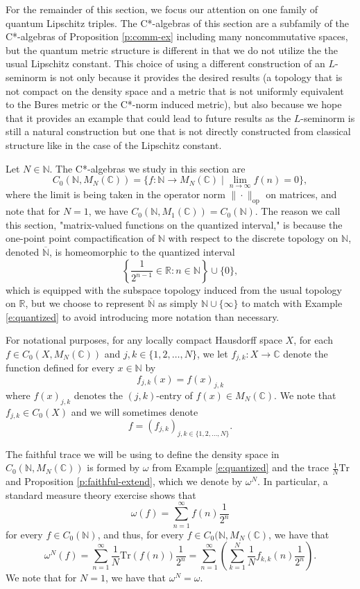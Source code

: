 \documentclass{amsart}
\theoremstyle{plain}
\theoremstyle{definition}
\theoremstyle{remark}
\numberwithin{equation}{section}
\newcommand{\om}{{\omega}}
\newcommand{\N}{{\mathds{N}}}
\newcommand{\R}{{\mathds{R}}}
\newcommand{\C}{{\mathds{C}}}
\begin{document}
For the remainder of this section, we focus our attention on one family of quantum Lipschitz triples. The C*-algebras of this section are a subfamily of the C*-algebras of Proposition \ref{p:comm-ex} including many noncommutative spaces, but the quantum metric structure is different in that we do not utilize the  the usual Lipschitz constant. This choice of using a different construction of an $L$-seminorm is not only because it provides the desired results (a topology that is not compact on the density space and a metric that is not uniformly equivalent to the Bures metric or the C*-norm induced metric), but also because we hope that it provides an example that could lead to future results   as the $L$-seminorm is still a natural construction but one that is not directly constructed from classical structure like in the case of the Lipschitz constant.



Let $N\in \N$. The C*-algebras we study in this section are
\[
C_0(\N, M_N(\C))=\{f:\N \rightarrow M_N(\C) \mid \lim_{n\to \infty}f(n)=0\},
\]
where the limit is being taken in the operator norm  $\|\cdot\|_\mathrm{op}$ on matrices, 
and note that for $N=1$, we have $C_0(\N, M_1(\C))=C_0(\N)$. 
The reason we call this section, "matrix-valued functions on the quantized interval," is because the one-point point compactification of $\N$ with respect to the discrete topology on $\N$, denoted $\overline{\N}$, is homeomorphic to the quantized interval
\[
\left\{ \frac{1}{2^{n-1}}\in \R : n\in \N\right\}\cup \{0\},
\]
which is equipped with the subspace topology induced from the usual topology on $\R$,  
but we choose to represent $\overline{\N}$ as simply $\N\cup \{\infty\}$ to match with Example \ref{e:quantized} to avoid introducing more notation than necessary.  

For notational purposes, for any locally compact Hausdorff space $X$, for each $f\in C_0(X, M_N(\C))$ and $j,k\in \{1, 2, \ldots, N\}$, we let $f_{j,k}: X\rightarrow \C$ denote the function defined for every $x\in \N$ by 
\[
f_{j,k}(x)=f(x)_{j,k}
\]
where $f(x)_{j,k}$ denotes the $(j,k)$-entry of $f(x)\in M_N(\C)$. We note that $f_{j,k}\in C_0(X)$ and we will sometimes denote
\[
f=(f_{j,k})_{j,k\in \{1,2,\ldots, N\}}.
\]

The faithful trace we will be using to define the density space in $C_0(\N, M_N(\C))$ is  formed by $\omega$ from Example \ref{e:quantized} and the trace $\frac{1}{N}\mathrm{Tr}$ and Proposition \ref{p:faithful-extend}, which we denote by $\om^N$. In particular,  a standard measure theory exercise shows that 
\[
\omega(f)=\sum_{n=1}^\infty f(n)\frac{1}{2^n}
\]
for every $f\in C_0(\N)$, and thus, for every $f\in C_0(\N, M_N(\C)$, we have that 
\[
\om^N(f)=\sum_{n=1}^\infty \frac{1}{N}\mathrm{Tr}(f(n))\frac{1}{2^n}=\sum_{n=1}^\infty \left(\sum_{k=1}^N\frac{1}{N}f_{k,k}(n)\frac{1}{2^n}\right).
\] 
We note that for $N=1$, we have that $\om^N=\om$.
\end{document}
